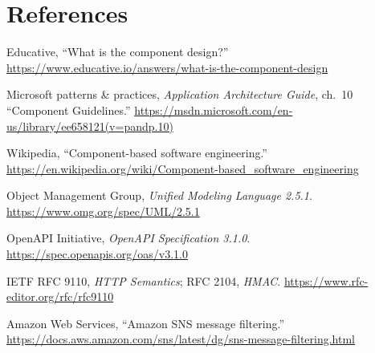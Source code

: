 \section*{References}
\begin{enumerate}[label={[\arabic*]},leftmargin=2.2em]
\item Educative, ``What is the component design?'' \url{https://www.educative.io/answers/what-is-the-component-design}
\item Microsoft patterns \& practices, \emph{Application Architecture Guide}, ch.~10 ``Component Guidelines.'' \url{https://msdn.microsoft.com/en-us/library/ee658121(v=pandp.10)}
\item Wikipedia, ``Component-based software engineering.'' \url{https://en.wikipedia.org/wiki/Component-based_software_engineering}
\item Object Management Group, \emph{Unified Modeling Language 2.5.1}. \url{https://www.omg.org/spec/UML/2.5.1}
\item OpenAPI Initiative, \emph{OpenAPI Specification 3.1.0}. \url{https://spec.openapis.org/oas/v3.1.0}
\item IETF RFC 9110, \emph{HTTP Semantics}; RFC 2104, \emph{HMAC}. \url{https://www.rfc-editor.org/rfc/rfc9110}
\item Amazon Web Services, ``Amazon SNS message filtering.'' \url{https://docs.aws.amazon.com/sns/latest/dg/sns-message-filtering.html}
\end{enumerate}

